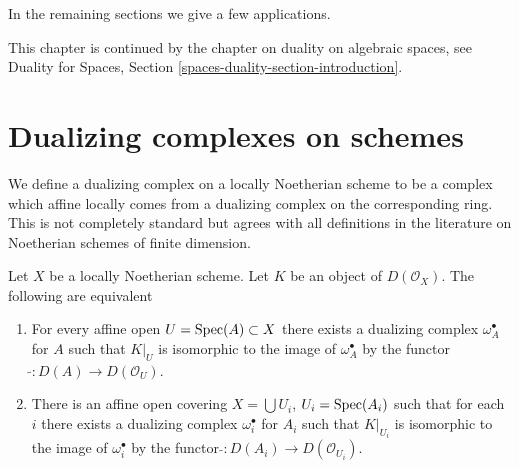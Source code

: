 \medskip\noindent
In the remaining sections we give a few applications.

\medskip\noindent
This chapter is continued by the chapter on duality
on algebraic spaces, see
Duality for Spaces, Section \ref{spaces-duality-section-introduction}.







\section{Dualizing complexes on schemes}
\label{section-dualizing-schemes}

\noindent
We define a dualizing complex on a locally Noetherian scheme
to be a complex which affine locally comes from a dualizing
complex on the corresponding ring. This is not completely
standard but agrees with all definitions in the literature
on Noetherian schemes of finite dimension.

\begin{lemma}
\label{lemma-equivalent-definitions}
Let $X$ be a locally Noetherian scheme. Let $K$ be an object of
$D(\mathcal{O}_X)$. The following are equivalent
\begin{enumerate}
\item For every affine open $U = \mathop{\mathrm{Spec}}(A) \subset X$ there exists
a dualizing complex $\omega_A^\bullet$ for $A$ such that
$K|_U$ is isomorphic to the image of $\omega_A^\bullet$ by
the functor $\widetilde{} : D(A) \to D(\mathcal{O}_U)$.
\item There is an affine open covering $X = \bigcup U_i$, $U_i = \mathop{\mathrm{Spec}}(A_i)$
such that for each $i$ there exists a dualizing complex $\omega_i^\bullet$ for
$A_i$ such that $K|_{U_i}$ is isomorphic to the image of $\omega_i^\bullet$ by
the functor $\widetilde{} : D(A_i) \to D(\mathcal{O}_{U_i})$.
\end{enumerate}
\end{lemma}

